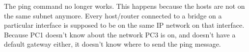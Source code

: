 The ping command no longer works. This happens because the hosts are not on the same subnet anymore.
Every host/router connected to a bridge on a particular interface is supposed to be on the same IP
network on that interface. Because PC1 doesn't know about the network PC3 is on, and doesn't have a
default gateway either, it doesn't know where to send the ping message.

